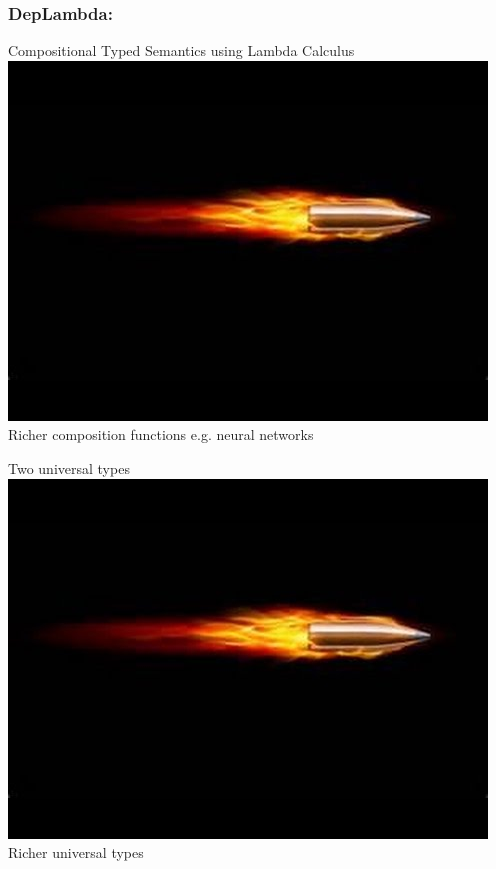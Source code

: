 \documentclass[mathserif,12pt]{beamer}
\begin{document}
\begin{frame}
  \frametitle{DepLambda:  }
\large
Compositional Typed Semantics using Lambda Calculus \\
\pause
\includegraphics[trim=16em 14em 4em 10em,clip=true,scale=0.2]{figures/bullet}\; Richer composition functions e.g. neural networks

\vspace{2em}
\pause
Two universal types\\
\pause
\includegraphics[trim=16em 14em 4em 10em,clip=true,scale=0.2]{figures/bullet}\; Richer universal types


\end{frame}
\end{document}
